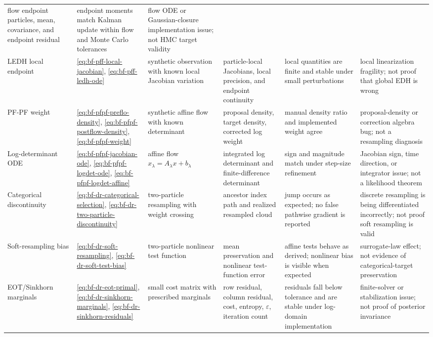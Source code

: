 \begin{center}
\begin{longtable}{@{}p{} p{} p{} p{} p{} p{}@{}}
flow endpoint particles, mean, covariance, and endpoint residual &
endpoint moments match Kalman update within flow and Monte Carlo tolerances &
flow ODE or Gaussian-closure implementation issue; not HMC target validity \\
LEDH local endpoint &
\eqref{eq:bf-pff-local-jacobian}, \eqref{eq:bf-pff-ledh-ode} &
synthetic observation with known local Jacobian variation &
particle-local Jacobians, local precision, and endpoint continuity &
local quantities are finite and stable under small perturbations &
local linearization fragility; not proof that global EDH is wrong \\
PF-PF weight &
\eqref{eq:bf-pfpf-preflo-density}, \eqref{eq:bf-pfpf-postflow-density}, \eqref{eq:bf-pfpf-weight} &
synthetic affine flow with known determinant &
proposal density, target density, corrected log weight &
manual density ratio and implemented weight agree &
proposal-density or correction algebra bug; not a resampling diagnosis \\
Log-determinant ODE &
\eqref{eq:bf-pfpf-jacobian-ode}, \eqref{eq:bf-pfpf-logdet-ode}, \eqref{eq:bf-pfpf-logdet-affine} &
affine flow $x_\lambda=A_\lambda x+b_\lambda$ &
integrated log determinant and finite-difference determinant &
sign and magnitude match under step-size refinement &
Jacobian sign, time direction, or integrator issue; not a likelihood theorem \\
Categorical discontinuity &
\eqref{eq:bf-dr-categorical-selection}, \eqref{eq:bf-dr-two-particle-discontinuity} &
two-particle resampling with weight crossing &
ancestor index path and realized resampled cloud &
jump occurs as expected; no false pathwise gradient is reported &
discrete resampling is being differentiated incorrectly; not proof soft resampling is valid \\
Soft-resampling bias &
\eqref{eq:bf-dr-soft-resampling}, \eqref{eq:bf-dr-soft-test-bias} &
two-particle nonlinear test function &
mean preservation and nonlinear test-function error &
affine tests behave as derived; nonlinear bias is visible when expected &
surrogate-law effect; not evidence of categorical-target preservation \\
EOT/Sinkhorn marginals &
\eqref{eq:bf-dr-eot-primal}, \eqref{eq:bf-dr-sinkhorn-marginals}, \eqref{eq:bf-dr-sinkhorn-residuals} &
small cost matrix with prescribed marginals &
row residual, column residual, cost, entropy, $\varepsilon$, iteration count &
residuals fall below tolerance and are stable under log-domain implementation &
finite-solver or stabilization issue; not proof of posterior invariance \\

\end{longtable}
\end{center}
